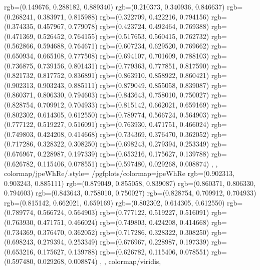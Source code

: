 {{{      rgb=(0.149676, 0.288182, 0.889340)
      rgb=(0.210373, 0.340936, 0.846637)
      rgb=(0.268241, 0.383971, 0.815988)
      rgb=(0.322709, 0.422216, 0.794156)
      rgb=(0.374335, 0.457967, 0.779078)
      rgb=(0.423724, 0.492464, 0.769388)
      rgb=(0.471369, 0.526452, 0.764155)
      rgb=(0.517653, 0.560415, 0.762732)
      rgb=(0.562866, 0.594688, 0.764671)
      rgb=(0.607234, 0.629520, 0.769662)
      rgb=(0.650934, 0.665108, 0.777508)
      rgb=(0.694107, 0.701609, 0.788103)
      rgb=(0.736875, 0.739156, 0.801431)
      rgb=(0.779363, 0.777851, 0.817590)
      rgb=(0.821732, 0.817752, 0.836891)
      rgb=(0.863910, 0.858922, 0.860421)
      rgb=(0.902313, 0.903243, 0.885111)
      rgb=(0.879049, 0.855058, 0.839087)
      rgb=(0.860371, 0.806330, 0.794603)
      rgb=(0.843643, 0.758010, 0.750027)
      rgb=(0.828754, 0.709912, 0.704933)
      rgb=(0.815142, 0.662021, 0.659169)
      rgb=(0.802302, 0.614305, 0.612550)
      rgb=(0.789774, 0.566724, 0.564903)
      rgb=(0.777122, 0.519227, 0.516091)
      rgb=(0.763930, 0.471751, 0.466024)
      rgb=(0.749803, 0.424208, 0.414668)
      rgb=(0.734369, 0.376470, 0.362052)
      rgb=(0.717286, 0.328322, 0.308250)
      rgb=(0.698243, 0.279394, 0.253349)
      rgb=(0.676967, 0.228987, 0.197339)
      rgb=(0.653216, 0.175627, 0.139788)
      rgb=(0.626782, 0.115406, 0.078551)
      rgb=(0.597480, 0.029268, 0.008874)
    },
  },
  colormap/jpeWhRe/.style={%
    /pgfplots/colormap={jpeWhRe}{%
      rgb=(0.902313, 0.903243, 0.885111)
      rgb=(0.879049, 0.855058, 0.839087)
      rgb=(0.860371, 0.806330, 0.794603)
      rgb=(0.843643, 0.758010, 0.750027)
      rgb=(0.828754, 0.709912, 0.704933)
      rgb=(0.815142, 0.662021, 0.659169)
      rgb=(0.802302, 0.614305, 0.612550)
      rgb=(0.789774, 0.566724, 0.564903)
      rgb=(0.777122, 0.519227, 0.516091)
      rgb=(0.763930, 0.471751, 0.466024)
      rgb=(0.749803, 0.424208, 0.414668)
      rgb=(0.734369, 0.376470, 0.362052)
      rgb=(0.717286, 0.328322, 0.308250)
      rgb=(0.698243, 0.279394, 0.253349)
      rgb=(0.676967, 0.228987, 0.197339)
      rgb=(0.653216, 0.175627, 0.139788)
      rgb=(0.626782, 0.115406, 0.078551)
      rgb=(0.597480, 0.029268, 0.008874)
    },
  },
  colormap/viridis,
}
